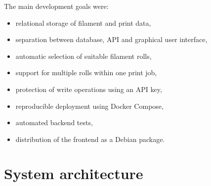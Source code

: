 \documentclass[a4paper,11pt]{article}
\begin{document}
The main development goals were:

\begin{itemize}
  \item relational storage of filament and print data,
  \item separation between database, API and graphical user interface,
  \item automatic selection of suitable filament rolls,
  \item support for multiple rolls within one print job,
  \item protection of write operations using an API key,
  \item reproducible deployment using Docker Compose,
  \item automated backend tests,
  \item distribution of the frontend as a Debian package.
\end{itemize}

\section{System architecture}
\end{document}
